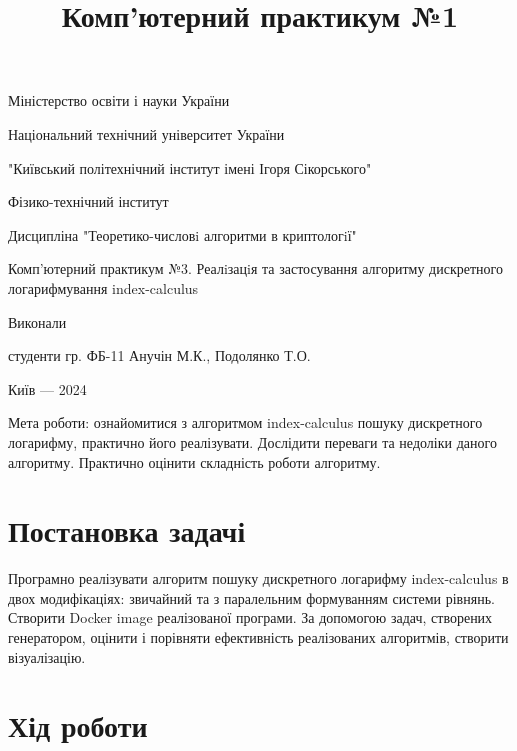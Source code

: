 \documentclass[14pt,a4paper,final]{extreport}
\title{Комп'ютерний практикум №1}
\date{}
\begin{document}
\begin{center}
    Міністерство освіти і науки України

    Національний технічний університет України

    "Київський політехнічний інститут імені Ігоря Сікорського"

    Фізико-технічний інститут
\end{center}
\vspace{\baselineskip}
\vspace{\baselineskip}
\vspace{\baselineskip}
\begin{center}
    Дисципліна "Теоретико-числовi алгоритми в криптологiї"
\end{center}
    \vspace{\baselineskip}
    \begin{center}
        Комп'ютерний практикум №3. Реалiзацiя та застосування алгоритму дискретного логарифмування index-calculus
    \end{center}
\vspace{\baselineskip}
\vspace{\baselineskip}
\vspace{\baselineskip}
\begin{center}
    Виконали
\end{center}
\begin{flushright}
    студенти гр. ФБ-11 Анучін М.К., Подолянко Т.О.
\end{flushright}
\vfill
\begin{center}
    Київ — 2024
\end{center}
\thispagestyle{empty}
\pagebreak

Мета роботи: ознайомитися з алгоритмом index-calculus пошуку дискретного логарифму, практично його реалізувати.
Дослідити переваги та недоліки даного алгоритму. Практично оцінити складність роботи алгоритму.

\section*{Постановка задачі}

Програмно реалізувати алгоритм пошуку дискретного логарифму index-calculus в двох модифікаціях: звичайний та з паралельним формуванням системи рівнянь.
Створити Docker image реалізованої програми. За допомогою задач, створених генератором, оцінити і порівняти ефективність реалізованих алгоритмів, 
створити візуалізацію.

\section*{Хід роботи}
\end{document}
